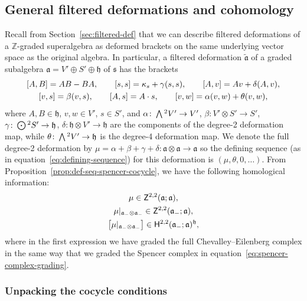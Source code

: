 \documentclass[11pt]{article}
\numberwithin{equation}{section}
\numberwithin{equation}{section}
\newcommand{\fa}{\mathfrak{a}}
\newcommand{\fh}{\mathfrak{h}}
\newcommand{\fs}{\mathfrak{s}}
\newcommand{\ZZ}{\mathbb{Z}}
\newcommand{\ssH}{\mathsf{H}}
\newcommand{\ssZ}{\mathsf{Z}}
\newcommand{\fatilde}{\widetilde{\fa}}
\newcommand{\Wedge}{\mathchoice{{\textstyle\bigwedge}}{\bigwedge}{\bigwedge}{\bigwedge}}	%
\newcommand{\Odot}{\mathchoice{{\textstyle\bigodot}}{\bigodot}{\bigodot}{\bigodot}}
\newcommand{\1}{\mathbbm{1}}
\begin{document}
\subsection{General filtered deformations and cohomology}
\label{sec:filtered-def-cohom}

Recall from Section~\ref{sec:filtered-def} that we can describe filtered deformations of a $\ZZ$-graded superalgebra as deformed brackets on the same underlying vector space as the original algebra. In particular, a filtered deformation $\fatilde$ of a graded subalgebra $\fa=V'\oplus S'\oplus \fh$ of $\fs$ has the brackets
\begin{gather}
	\comm{A}{B} = AB-BA,\qquad
	\comm{s}{s} = \kappa_s + \gamma(s,s),\qquad
	\comm{A}{v} = Av + \delta(A,v),
	\nonumber\\
	\comm{v}{s} = \beta(v,s),\qquad\comm{A}{s} = A\cdot s
	, \qquad\comm{v}{w} = \alpha(v,w) + \theta(v,w),\label{eq:def-brackets-general}
\end{gather}
where $A,B\in\fh$, $v,w\in V'$, $s\in S'$, and
$\alpha\colon \Wedge^2V' \to V'$, $
	\beta\colon V'\otimes S' \to S'$, $
	\gamma\colon \Odot^2 S' \to \fh$, $
	\delta\colon \fh\otimes V' \to \fh
$
are the components of the degree-2 deformation map, while
$\theta\colon \Wedge^2 V' \to \fh
$
is the degree-4 deformation map. We denote the full degree-2 deformation by
${\mu=\alpha+\beta+\gamma+\delta\colon \fa\otimes\fa \to \fa}
$
so the defining sequence (as in equation~\eqref{eq:defining-sequence}) for this deformation is $(\mu,\theta,0,\dots)$. From Proposition~\ref{prop:def-seq-spencer-cocycle}, we have the following homological information:
\begin{gather}
	\mu \in \ssZ^{2,2}(\fa;\fa),	\label{eq:mu-CE-cocycle}	\\
	\mu|_{\fa_-\otimes\fa_-} \in \ssZ^{2,2}(\fa_-;\fa),	\label{eq:mu-spencer-cocycle}	\\
	\qty[\mu|_{\fa_-\otimes\fa_-}] \in \ssH^{2,2}(\fa_-;\fa)^\fh, \label{eq:mu-invt-class}
\end{gather}
where in the first expression we have graded the full Chevalley--Eilenberg complex in the same way that we graded the Spencer complex in equation~\eqref{eq:spencer-complex-grading}.

\subsubsection{Unpacking the cocycle conditions}
\end{document}
